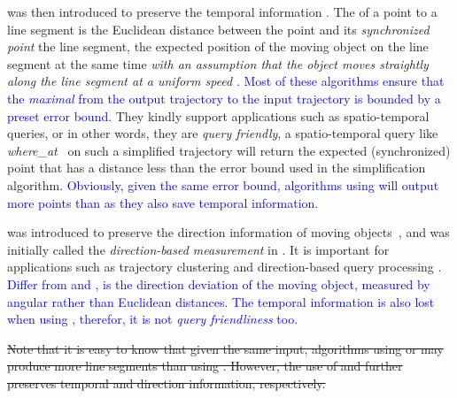 { \sed was then introduced to preserve the temporal information \cite{Meratnia:Spatiotemporal,Cao:Spatio}. 
The \sed of a point to a line segment is the Euclidean distance between the point and its \emph{synchronized point} \wrt the line segment, the expected position of the moving object on the line segment at the same time \emph{with an assumption that the object moves straightly along the line segment at a uniform speed} \cite{Cao:Spatio}. \textcolor{blue}{Most of these algorithms ensure that the \emph{maximal} \sed from the output trajectory to the input trajectory is bounded by a preset error bound.} 
They kindly support applications such as spatio-temporal queries, or in other words, they are \emph{query friendly}, \ie a spatio-temporal query like \emph{where\_at}~\cite{Cao:Spatio} on such a simplified trajectory will return the expected (synchronized) point that has a distance less than the error bound used in the simplification algorithm.
\textcolor{blue}{Obviously, given the same error bound, algorithms using \sed will output more points than \ped as they also save temporal information.}
%



\dad was introduced to preserve the direction information of moving objects~\cite{Long:Direction, Zhang:Evaluation}, and was initially called the \emph{direction-based measurement} in \cite{Long:Direction}. 
It is important for applications such as trajectory clustering and direction-based query processing \cite{Long:Direction,Long:Mining}.
\textcolor{blue}{Differ from \ped and \sed, \dad is the direction deviation of the moving object, measured by angular rather than Euclidean distances.}
\textcolor{blue}{The temporal information is also lost when using \dad, therefor, it is not \emph{query friendliness} too.}

%
\sout{Note that it is easy to know that given the same input, \lsa algorithms using \sed or \dad may produce more line segments than using \ped. However, the use of \sed and \dad further preserves temporal and direction information, respectively.}

}
